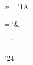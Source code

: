 \chardef \ae = "1A                      %

\chardef \ampersand = `\&               %

\let \& = \ampersand

\chardef \atsign = `\@                  %

\let \@ = \atsign

\def \backslash {%
  \ensurepar
  \if \mathmodep
    \zmbackslash
  \else \if \monoencodingp
    \char "5C\relax
  \else
    \PSbackslash
  \fi\fi}

\let \\=\backslash

\def \baselinebullet #1{%
  \zrequiredoodad{\zdoodadfont}{#1}%
  \hbox{\zdoodadfont .}}

\def \bullet {%
  \ensurepar
  \if \mathmodep
    \zmbullet
  \else
    \PSbullet
  \fi}

\def \cent {%
  \ensurepar
  \PScent}

\let \cents = \cent

\def \copyright {%
  \ensurepar
  \PScopyright}

\def \cdquote {''}                      %

\def \dagger {%
  \ensurepar
  \if \mathmodep
    \zmdagger
  \else
    \PSdagger
  \fi}

\def \ddagger {%
  \ensurepar
  \if \mathmodep
    \zmddagger
  \else
    \PSddagger
  \fi}

\def \dollar {%
  \zprehyph{\dollarhyph}%
  \if \monoencodingp
    \char "24\relax
  \else
    \PSdollar
  \fi
  \zposthyph{\dollarhyph}}

\let \$ = \dollar

\def \ellipsis {%
  \if \mathmodep
    \ldots
  \else
    \unbreakable\thickspace 
    .\unbreakable\thickspace
    .\unbreakable\thickspace
    .\thickspace
    \ignorespaces
  \fi}

\def \emdash {---}                      %

\def \endash {--}                       %

